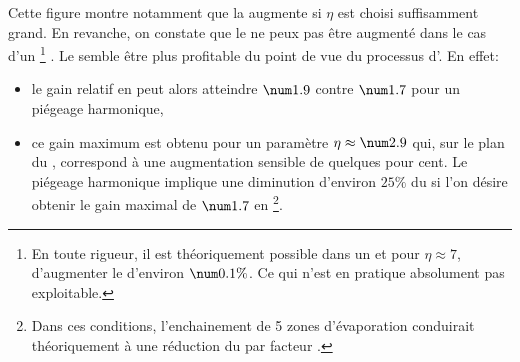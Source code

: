 \noindent Cette figure montre notamment que la \ddedpup augmente si $\eta$ est choisi suffisamment grand. En revanche, on constate que le \tcolel ne peux pas être augmenté dans le cas d'un \cthar%
%
\footnote{En toute rigueur, il est théoriquement possible dans un \cthar et pour $\eta \approx 7$, d'augmenter le \tcolel d'environ $\val{0.1}\%$. Ce qui n'est en pratique absolument pas exploitable.}%
. 
Le \ctlin semble être plus profitable du point de vue du processus d'\evap. En effet: 
\begin{itemize}
	\item  le gain relatif en \ddedpup peut alors atteindre $\val{1.9}$ contre $\val{1.7}$ pour un piégeage harmonique,
	\item ce gain maximum est obtenu pour un paramètre $\eta \approx \val{2.9}$ qui, sur le plan du \tcolel, correspond à une augmentation sensible de quelques pour cent. Le piégeage harmonique implique une diminution d'environ $25\%$ du \tcolel si l'on désire obtenir le gain maximal de $\val{1.7}$ en \ddedp%
\footnote{Dans ces conditions, l'enchainement de 5 zones d'évaporation conduirait théoriquement à une réduction du \tcolel par facteur .}.
\end{itemize}



\RemonteUnPeuFig
\RemonteUnPeuFig

